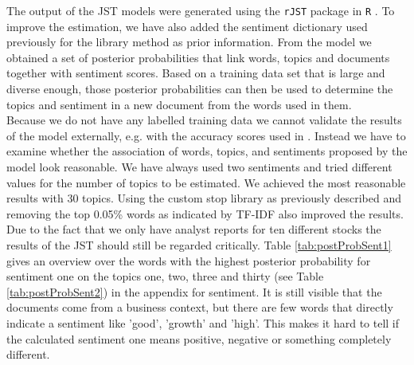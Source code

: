 The output of the JST models were generated using the \texttt{rJST} package in \texttt{R} \citep{rJST}. To improve the estimation, we have also added the sentiment dictionary used previously for the library method as prior information. From the model we obtained a set of posterior probabilities that link words, topics and documents together with sentiment scores. Based on a training data set that is large and diverse enough, those posterior probabilities can then be used to determine the topics and sentiment in a new document from the words used in them. 
\\
Because we do not have any labelled training data we cannot validate the results of the model externally, e.g. with the accuracy scores used in \citet{lin2009joint}. Instead we have to examine whether the association of words, topics, and sentiments proposed by the model look reasonable. We have always used two sentiments and tried different values for the number of topics to be estimated. We achieved the most reasonable results with 30 topics. Using the custom stop library as previously described and removing the top 0.05\% words as indicated by TF-IDF also improved the results. Due to the fact that we only have analyst reports for ten different stocks the results of the JST should still be regarded critically. 
Table \ref{tab:postProbSent1} gives an overview over the words  with the highest posterior probability for sentiment one on the topics one, two, three and thirty (see Table \ref{tab:postProbSent2}) in the appendix for sentiment. It is still visible that the documents come from a business context, but there are few words that directly indicate a sentiment like 'good', 'growth' and 'high'. This makes it hard to tell if the calculated sentiment one means positive, negative or something completely different. \\

